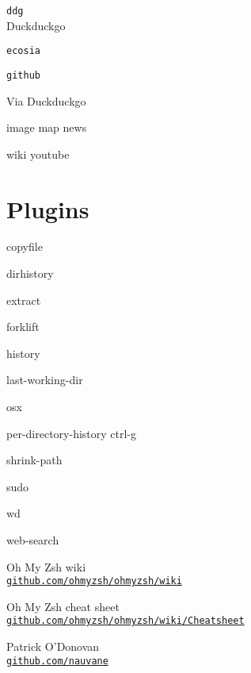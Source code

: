 \documentclass[a4paper,landscape,columns=3]{cheatsheet}
\newcommand{\code}{\texttt}
\newcommand{\codequiv}{\dsm}
\begin{document}
\code{ddg}\\
Duckduckgo

\code{ecosia}

\code{github}

Via Duckduckgo

\ttfamily

image \qquad map \qquad news

wiki \qquad youtube

\columnbreak

\section{Plugins}

copyfile

dirhistory 

extract

forklift

history

last-working-dir

osx

per-directory-history {\codequiv{(}}ctrl-g{\codequiv{)}}

shrink-path

sudo

wd

web-search 

\columnbreak

\sffamily

Oh My Zsh wiki\\
{\code{\href{https://github.com/ohmyzsh/ohmyzsh/wiki}{github.com/ohmyzsh/ohmyzsh/wiki}}}

\sffamily

Oh My Zsh cheat sheet\\
{\code{\href{https://github.com/ohmyzsh/ohmyzsh/wiki/Cheatsheet}{github.com/ohmyzsh/ohmyzsh/wiki/Cheatsheet}}}

Patrick O'Donovan\\
{\code{\href{https://github.com/nauvane}{github.com/nauvane}}}
\end{document}
